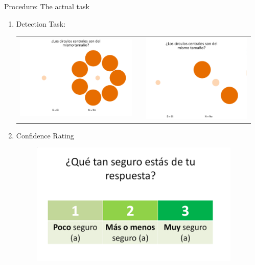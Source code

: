\documentclass[final]{beamer}
\newlength{\onecolwid}
\newlength{\twocolwid}
\begin{document}
\begin{frame}[t]
\begin{columns}[t]
\begin{column}{\twocolwid}
\begin{columns}[t,totalwidth=\twocolwid]
\begin{column}{\onecolwid}
\begin{alertblock}{Procedure: The actual task}
\begin{enumerate}
\item Detection Task:
\begin{center}
\begin{tabular}{ccc}
\includegraphics[width=0.45\linewidth]{Figures/MainTask.png} & \hfill & \includegraphics[width=0.4\linewidth]{Figures/MainTask2.png}
\end{tabular}
\end{center}
\item Confidence Rating
\begin{figure}
\includegraphics[width=0.5\linewidth]{Figures/ConfidenceTask.png}
\end{figure}
\end{enumerate}
\end{alertblock}
\end{column} %


\begin{column}{\twocolwid}\vspace{-.6in} %



\end{column}
\end{columns}
\end{column}
\end{columns}
\end{frame}
\end{document}
